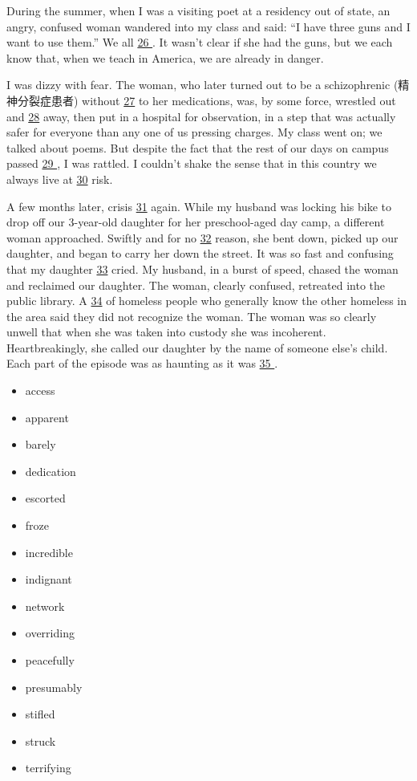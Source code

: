 \documentclass[UTF8,11pt]{ctexart}
\begin{document}
During the summer, when I was a visiting poet at a residency out of state, an angry, confused woman wandered into my class and said: “I have three guns and I want to use them.” We all \uline{26 }. It wasn’t clear if she had the guns, but we each know that, when we teach in America, we are already in danger.


I was dizzy with fear. The woman, who later turned out to be a schizophrenic (精神分裂症患者) without \uline{27} to her medications, was, by some force, wrestled out and \uline{28} away, then put in a hospital for observation, in a step that was actually safer for everyone than any one of us pressing charges. My class went on; we talked about poems. But despite the fact that the rest of our days on campus passed \uline{29 }, I was rattled. I couldn’t shake the sense that in this country we always live at \uline{30} risk.


A few months later, crisis \uline{31} again. While my husband was locking his bike to drop off our 3-year-old daughter for her preschool-aged day camp, a different woman approached. Swiftly and for no \uline{32} reason, she bent down, picked up our daughter, and began to carry her down the street. It was so fast and confusing that my daughter \uline{33} cried. My husband, in a burst of speed, chased the woman and reclaimed our daughter. The woman, clearly confused, retreated into the public library. A \uline{34} of homeless people who generally know the other homeless in the area said they did not recognize the woman. The woman was so clearly unwell that when she was taken into custody she was incoherent. Heartbreakingly, she called our daughter by the name of someone else’s child. Each part of the episode was as haunting as it was \uline{35 }.


\begin{itemize}[leftmargin=2em,itemsep=.2em,topsep=.4em]\item[A.] access
\item[B.] apparent
\item[C.] barely
\item[D.] dedication
\item[E.] escorted
\item[F.] froze
\item[G.] incredible
\item[H.] indignant
\item[I.] network
\item[J.] overriding
\item[K.] peacefully
\item[L.] presumably
\item[M.] stifled
\item[N.] struck
\item[O.] terrifying
\end{itemize}
\end{document}
